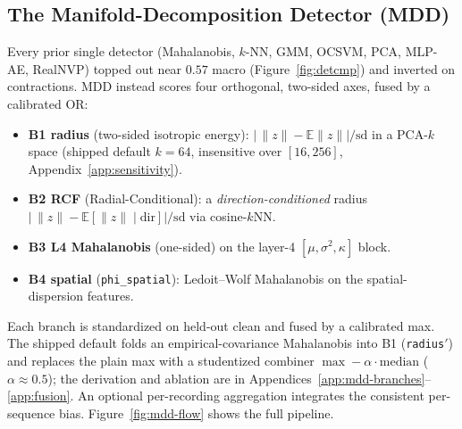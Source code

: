 ﻿\documentclass{article} %
\theoremstyle{remark}
\begin{document}
\subsection{The Manifold-Decomposition Detector (MDD)}
\label{sec:mdd}

Every prior single detector (Mahalanobis, $k$-NN, GMM, OCSVM, PCA, MLP-AE, RealNVP) topped out near
$0.57$ macro (Figure~\ref{fig:detcmp}) and inverted on contractions. MDD instead scores four
orthogonal, two-sided axes, fused by a calibrated OR:
%
\begin{itemize}[nosep,leftmargin=1.2em]
  \item \textbf{B1 radius} (two-sided isotropic energy): $|\,\lVert z\rVert-\mathbb{E}\lVert
        z\rVert|/\mathrm{sd}$ in a PCA-$k$ space (shipped default $k{=}64$, insensitive over
        $[16,256]$, Appendix~\ref{app:sensitivity}).
  \item \textbf{B2 RCF} (Radial-Conditional): a \emph{direction-conditioned}
        radius $|\,\lVert z\rVert-\mathbb{E}[\lVert z\rVert\mid\text{dir}]|/\mathrm{sd}$ via
        cosine-$k$NN.
  \item \textbf{B3 L4 Mahalanobis} (one-sided) on the layer-4 $[\mu,\sigma^2,\kappa]$ block.
  \item \textbf{B4 spatial} (\texttt{phi\_spatial}): Ledoit--Wolf Mahalanobis
        on the spatial-dispersion features.
\end{itemize}
%
Each branch is standardized on held-out clean and fused by a calibrated max. The shipped default
folds an empirical-covariance Mahalanobis into B1 (\texttt{radius}$'$) and replaces the plain max
with a studentized combiner $\max-\alpha\cdot\mathrm{median}$ ($\alpha\!\approx\!0.5$); the
derivation and ablation are in Appendices~\ref{app:mdd-branches}--\ref{app:fusion}. An optional
per-recording aggregation integrates the consistent per-sequence bias. Figure~\ref{fig:mdd-flow}
shows the full pipeline.
\end{document}
